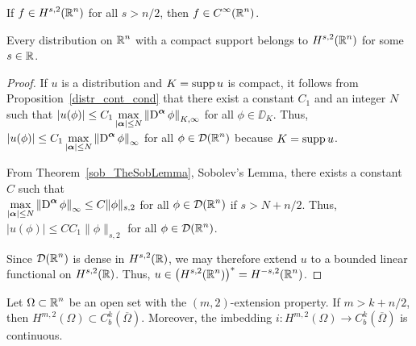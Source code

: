 \begin{cor}
If $\displaystyle f\in H^{s,2}(\mathbb{R}^n)$ for all $s>n/2$, then
$\displaystyle f\in C^\infty(\mathbb{R}^n)$.
\end{cor}

\begin{cor} \label{sob_TheSobLemma_Cor1}
Every distribution on $\displaystyle \mathbb{R}^n$ with a compact support belongs to
$\displaystyle H^{s,2}(\mathbb{R}^n)$ for some $s\in \mathbb{R}$.
\end{cor}

\begin{proof}
If $u$ is a distribution and $K = \operatorname{supp} u$ is compact, it follows from
Proposition~\ref{distr_cont_cond} that there exist a constant $C_1$ and 
an integer $N$ such that
$\displaystyle \left| u(\phi) \right| \leq C_1 \max_{|{\bm{\alpha}}|\leq N}
\left\| \operatorname{D}^{{\bm{\alpha}}} \phi \right\|_{K,\infty}$ for all $\phi \in \DD_K$.
Thus,
$\displaystyle \left| u(\phi) \right| \leq C_1 \max_{|{\bm{\alpha}}|\leq N}
\left\| \operatorname{D}^{{\bm{\alpha}}} \phi \right\|_{\infty}$
for all $\displaystyle \phi \in \mathcal{D}(\mathbb{R}^n)$ because $K = \operatorname{supp} u$.

From Theorem~\ref{sob_TheSobLemma}, Sobolev's Lemma, there exists a
constant $C$ such that\\
$\displaystyle \max_{|{\bm{\alpha}}|\leq N}
\left\| \operatorname{D}^{{\bm{\alpha}}} \phi \right\|_{\infty} \leq C \|\phi\|_{s,2}$
for all $\displaystyle \phi \in \mathcal{D}(\mathbb{R}^n)$ if $s > N+ n/2$.  Thus,
$\displaystyle \left| u(\phi) \right| \leq C C_1 \|\phi\|_{s,2}$
for all $\displaystyle \phi \in \mathcal{D}(\mathbb{R}^n)$.

Since $\displaystyle \mathcal{D}(\mathbb{R}^n)$ is dense in
$\displaystyle H^{s,2}(\mathbb{R})$, we may
therefore extend $u$ to a bounded linear functional on
$\displaystyle H^{s,2}(\mathbb{R})$.  Thus,
$\displaystyle u \in \left( H^{s,2}(\mathbb{R}^n) \right)^\ast = H^{-s,2}(\mathbb{R}^n)$.
\end{proof}

\begin{cor} \label{sob_TheSobLemma_cor1}
Let $\displaystyle \Omega \subset \mathbb{R}^n$ be an open set with the
$(m,2)$-extension property. If $m>k +n/2$, then
$\displaystyle H^{m,2}(\Omega) \subset C_b^k(\overline{\Omega})$.
Moreover, the imbedding
$\displaystyle i:H^{m,2}(\Omega) \to C_b^k(\overline{\Omega})$
is continuous.
\end{cor}

